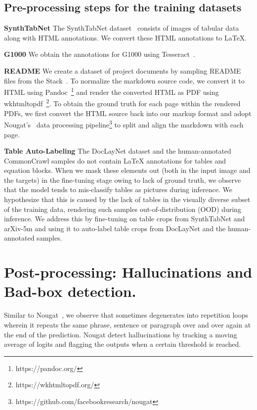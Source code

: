 \subsection{Pre-processing steps for the training datasets }

\textbf{SynthTabNet} The SynthTabNet dataset~\cite{nassar2022tableformer} consists of images of tabular data along with HTML annotations. We convert these HTML annotations to \LaTeX.

\textbf{G1000} We obtain the annotations for G1000 using Tesseract~\cite{smith2007overview}.

\textbf{README} We create a dataset of project documents by sampling README files from the Stack~\cite{Kocetkov2022TheStack}. To normalize the markdown source code, we convert it to HTML using Pandoc~\footnote{https://pandoc.org/} and render the converted HTML as PDF using wkhtmltopdf~\footnote{https://wkhtmltopdf.org/}. To obtain the ground truth for each page within the rendered PDFs, we first convert the HTML source back into our markup format and adopt Nougat's~\cite{Nougat} data processing pipeline\footnote{https://github.com/facebookresearch/nougat} to split and align the markdown with each page.

\textbf{Table Auto-Labeling} The DocLayNet dataset and the human-annotated CommonCrawl samples do not contain {\LaTeX} annotations for tables and equation blocks. When we mask these elements out (both in the input image and the targets) in the fine-tuning stage owing to lack of ground truth, we observe that the model tends to mis-classify tables as pictures during inference. We hypothesize that this is caused by the lack of tables in the visually diverse subset of the training data, rendering such samples out-of-distribution (OOD) during inference. We address this by fine-tuning \eclair on table crops from SynthTabNet and arXiv-5m and using it to auto-label table crops from DocLayNet and the human-annotated samples. 

\section{Post-processing: Hallucinations and Bad-box detection.}

Similar to Nougat~\cite{Nougat}, we observe that \eclair sometimes degenerates into repetition loops wherein it repeats the same phrase, sentence or paragraph over and over again at the end of the prediction. Nougat \cite{Nougat} detect hallucinations by tracking a moving average of logits and flagging the outputs when a certain threshold is reached.

